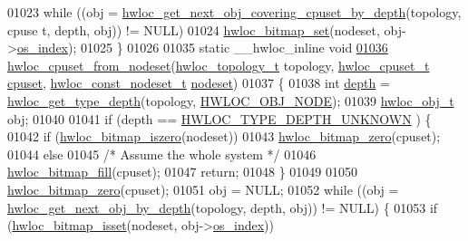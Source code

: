 \begin{DoxyCode}
01023         \textcolor{keywordflow}{while} ((obj = \hyperlink{a00056_ga2f9a4ec15e9cfae8c21501257a51ce5b}{hwloc_get_next_obj_covering_cpuset_by_depth}(topology, cpuse
      t, depth, obj)) != NULL)
01024                 \hyperlink{a00065_ga497556af0cc34f109ae0277999c074d3}{hwloc_bitmap_set}(nodeset, obj->\hyperlink{a00016_a61a7a80a68eaccbaaa28269e678c81a9}{os_index});
01025 \}
01026 
01035 \textcolor{keyword}{static} \_\_hwloc\_inline \textcolor{keywordtype}{void}
\hypertarget{a00031_source_l01036}{}\hyperlink{a00062_gaa677fd588304b5615de4ea78104adfb5}{01036} \hyperlink{a00062_gaa677fd588304b5615de4ea78104adfb5}{hwloc_cpuset_from_nodeset}(\hyperlink{a00039_ga9d1e76ee15a7dee158b786c30b6a6e38}{hwloc_topology_t} topology, \hyperlink{a00040_ga4bbf39b68b6f568fb92739e7c0ea7801}{hwloc_cpuset_t} \hyperlink{a00016_a67925e0f2c47f50408fbdb9bddd0790f}{cpuset}, 
      \hyperlink{a00040_ga2f5276235841ad66a79bedad16a5a10c}{hwloc_const_nodeset_t} \hyperlink{a00016_a08f0d0e16c619a6e653526cbee4ffea3}{nodeset})
01037 \{
01038         \textcolor{keywordtype}{int} \hyperlink{a00016_a9d82690370275d42d652eccdea5d3ee5}{depth} = \hyperlink{a00046_gaea7c64dd59467f5201ba87712710b14d}{hwloc_get_type_depth}(topology, \hyperlink{a00041_ggacd37bb612667dc437d66bfb175a8dc55aaf0964881117bdedf1a5e9332cd120dd}{HWLOC_OBJ_NODE});
01039         \hyperlink{a00016}{hwloc_obj_t} obj;
01040 
01041         \textcolor{keywordflow}{if} (depth == \hyperlink{a00046_ggaf4e663cf42bbe20756b849c6293ef575a0565ab92ab72cb0cec91e23003294aad}{HWLOC_TYPE_DEPTH_UNKNOWN} ) \{
01042                 \textcolor{keywordflow}{if} (\hyperlink{a00065_gaa94fed35d2a598bc4a8657b6955b7bf5}{hwloc_bitmap_iszero}(nodeset))
01043                         \hyperlink{a00065_ga6c540b9fe63b8223b6aba46d56dd63b8}{hwloc_bitmap_zero}(cpuset);
01044                 \textcolor{keywordflow}{else}
01045                         \textcolor{comment}{/* Assume the whole system */}
01046                         \hyperlink{a00065_ga52456f7ef79d68e610cb65e3f7ffafad}{hwloc_bitmap_fill}(cpuset);
01047                 \textcolor{keywordflow}{return};
01048         \}
01049 
01050         \hyperlink{a00065_ga6c540b9fe63b8223b6aba46d56dd63b8}{hwloc_bitmap_zero}(cpuset);
01051         obj = NULL;
01052         \textcolor{keywordflow}{while} ((obj = \hyperlink{a00053_gab7c1dce3f42ece5bfa621e87cf332418}{hwloc_get_next_obj_by_depth}(topology, depth, obj)) != NULL)
       \{
01053                 \textcolor{keywordflow}{if} (\hyperlink{a00065_ga2583f44cbdb5fff2ea40efdcf3975d3f}{hwloc_bitmap_isset}(nodeset, obj->\hyperlink{a00016_a61a7a80a68eaccbaaa28269e678c81a9}{os_index}))

\end{DoxyCode}
